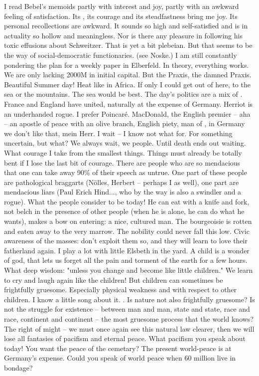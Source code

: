 
I read Bebel's memoids partly with interest and joy, partly with an awkward feeling of  satisfaction. Its , its courage and its steadfastness bring me joy. Its personal recollections are awkward. It sounds so high and self-satisfied and is in actuality so hollow and meaningless. Nor is there any pleasure in following his toxic effusions about Schweitzer. That is yet a bit plebeian. But that seems to be the way of social-democratic functionaries. (see Noske.) I am still constantly pondering the plan for a weekly paper in Elberfeld. In theory, everything works. We are only lacking 2000M in initial capital. But the Praxis, the damned Praxis. Beautiful Summer day! Heat like in Africa. If only I could get out of here, to the sea or the mountains. The sea would be best. The day's politics are a mix of . France and England have united, naturally at the expense of Germany. Herriot is an underhanded rogue. I prefer Poincaré. MacDonald, the English premier -- aha -- an apostle of peace with an olive branch, English piety, man of , in Germany we don't like that, mein Herr. I wait -- I know not what for. For something uncertain, but what? We always wait, we people. Until death ends out waiting. What courage I take from the smallest things. Things must already be totally bent if I lose the last bit of courage. There are people who are so mendacious that one can take away 90\% of their speech as untrue. One part of these people are pathological braggarts (Nölles, Herbert -- perhaps I as well), one part are mendacious liars (Paul Erich Hind..., who by the way is also a swindler and a rogue). What the people consider to be  today! He can eat with a knife and fork, not belch in the presence of other people (when he is alone, he can do what he wants), makes a  bow on entering: a nice, cultured man. The bourgeoisie is rotten and eaten away to the very marrow. The nobility could never fall this low. Civic awareness of the masses: don't exploit them so, and they will learn to love their fatherland again. I play a lot with little Elsbeth in the yard. A child is a wonder of god, that lets us forget all the pain and torment of the earth for a few hours. What deep wisdom: "unless you change and become like little children." We learn to cry and laugh again like the children! But children can sometimes be frightfully gruesome. Especially physical weakness and  with respect to other children. I know a little song about it. . Is nature not also frightfully gruesome? Is not the struggle for existence -- between man and man, state and state, race and race, continent and continent -- the most gruesome process that the world knows? The right of might -- we must once again see this natural law clearer, then we will lose all fantasies of pacifism and eternal peace. What pacifism you speak about today! You want the peace of the cemetary? The present world-peace is at Germany's expense. Could you speak of world peace when 60 million live in bondage? 